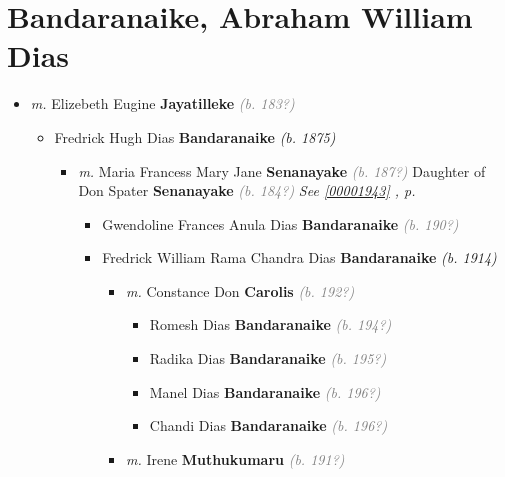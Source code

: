 \documentclass[10pt, openany]{book}
\begin{document}
\chapter{Bandaranaike, Abraham William Dias}
\label{00001849}
\textcolor{slmaroon}{\textit{}}
\begin{itemize}
\item{\textit{m.} Elizebeth Eugine \textbf{Jayatilleke} \textcolor{gray}{\textit{(b. 183?)}}   \label{couple:00001849:00001850} \begin{itemize}
\item{Fredrick Hugh Dias \textbf{Bandaranaike} \textcolor{slorange}{\textit{(b. 1875)}}
\begin{itemize}
\item{\textit{m.} Maria Francess Mary Jane \textbf{Senanayake} \textcolor{gray}{\textit{(b. 187?)}} Daughter of  Don Spater \textbf{Senanayake} \textcolor{gray}{\textit{(b. 184?)}} \textcolor{slteal}{\textit{See  \autoref{00001943} \textit{, p. \pageref{00001943} }}}   \label{couple:00001941:00001942} \begin{itemize}
\item{Gwendoline Frances Anula Dias \textbf{Bandaranaike} \textcolor{gray}{\textit{(b. 190?)}}
    }
\item{Fredrick William Rama Chandra Dias \textbf{Bandaranaike} \textcolor{slorange}{\textit{(b. 1914)}}
\begin{itemize}
\item{\textit{m.} Constance Don \textbf{Carolis} \textcolor{gray}{\textit{(b. 192?)}}   \label{couple:00001951:00001952} \begin{itemize}
\item{Romesh Dias \textbf{Bandaranaike} \textcolor{gray}{\textit{(b. 194?)}}
  }
\item{Radika Dias \textbf{Bandaranaike} \textcolor{gray}{\textit{(b. 195?)}}
  }
\item{Manel Dias \textbf{Bandaranaike} \textcolor{gray}{\textit{(b. 196?)}}
  }
\item{Chandi Dias \textbf{Bandaranaike} \textcolor{gray}{\textit{(b. 196?)}}
  }
\end{itemize}}
\item{\textit{m.} Irene \textbf{Muthukumaru} \textcolor{gray}{\textit{(b. 191?)}}   \label{couple:00001951:00001957} \begin{itemize}

\end{itemize}}
\end{itemize}}
\end{itemize}}
\end{itemize}}
\end{itemize}}
\end{itemize}
\end{document}
